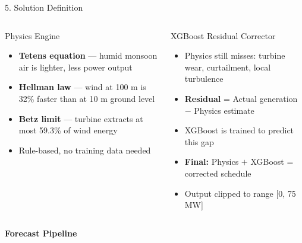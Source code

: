 \documentclass[aspectratio=169,10pt]{beamer}
\begin{document}
\begin{frame}{5. \; Solution Definition}
  \begin{columns}[T]
      \begin{block}{Physics Engine}
        \begin{itemize}\setlength\itemsep{3pt}
          \item \textbf{Tetens equation} --- humid monsoon air is lighter, less power output
          \item \textbf{Hellman law} --- wind at 100 m is 32\% faster than at 10 m ground level
          \item \textbf{Betz limit} --- turbine extracts at most 59.3\% of wind energy
          \item Rule-based, no training data needed
        \end{itemize}
      \end{block}
      \begin{block}{XGBoost Residual Corrector}
        \begin{itemize}\setlength\itemsep{3pt}
          \item Physics still misses: turbine wear, curtailment, local turbulence
          \item \textbf{Residual} = Actual generation $-$ Physics estimate
          \item XGBoost is trained to predict this gap
          \item \textbf{Final:} Physics $+$ XGBoost = corrected schedule
          \item Output clipped to range [0, 75 MW]
        \end{itemize}
      \end{block}
  \end{columns}

  \vspace{0.5cm}
  \centering
  {\small\textbf{\color{darkblue}Forecast Pipeline}}\\[6pt]
\end{frame}
\end{document}
